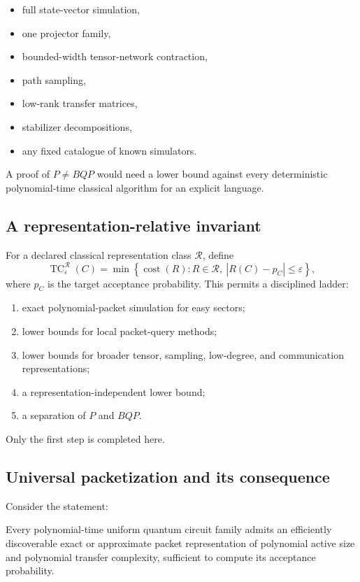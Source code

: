 \begin{itemize}
\item full state-vector simulation,
\item one projector family,
\item bounded-width tensor-network contraction,
\item path sampling,
\item low-rank transfer matrices,
\item stabilizer decompositions,
\item any fixed catalogue of known simulators.
\end{itemize}

A proof of $P\neq BQP$ would need a lower bound against every deterministic polynomial-time classical algorithm for an explicit language.

\subsection{A representation-relative invariant}
For a declared classical representation class $\mathcal R$, define
\[
\operatorname{TC}^{\mathcal R}_\varepsilon(C)
=
\min\left\{
\operatorname{cost}(R):
R\in\mathcal R,
\ |R(C)-p_C|\le\varepsilon
\right\},
\]
where $p_C$ is the target acceptance probability. This permits a disciplined ladder:

\begin{enumerate}
\item exact polynomial-packet simulation for easy sectors;
\item lower bounds for local packet-query methods;
\item lower bounds for broader tensor, sampling, low-degree, and communication representations;
\item a representation-independent lower bound;
\item a separation of $P$ and $BQP$.
\end{enumerate}

Only the first step is completed here.

\subsection{Universal packetization and its consequence}
Consider the statement:

\begin{conjecture}
Every polynomial-time uniform quantum circuit family admits an efficiently discoverable exact or approximate packet representation of polynomial active size and polynomial transfer complexity, sufficient to compute its acceptance probability.
\end{conjecture}

